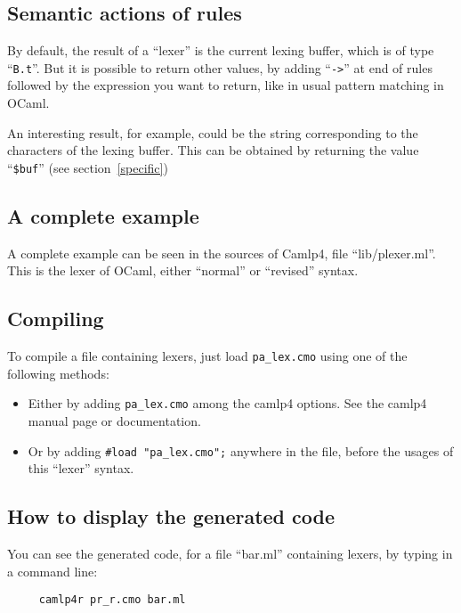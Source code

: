 \documentclass[11pt]{article}
\begin{document}
\subsection{Semantic actions of rules}

By default, the result of a ``lexer'' is the current lexing buffer,
which is of type ``\verb/B.t/''. But it is possible to return other
values, by adding ``\verb/->/'' at end of rules followed by the
expression you want to return, like in usual pattern matching in
OCaml.

An interesting result, for example, could be the string corresponding
to the characters of the lexing buffer. This can be obtained by
returning the value ``\verb/$buf/'' (see section~\ref{specific})

\subsection{A complete example}

A complete example can be seen in the sources of Camlp4, file
``lib/plexer.ml''. This is the lexer of OCaml, either ``normal'' or
``revised'' syntax.

\subsection{Compiling}

To compile a file containing lexers, just load \verb/pa_lex.cmo/ using
one of the following methods:

\begin{itemize}

\item Either by adding \verb/pa_lex.cmo/ among the camlp4 options. See
  the camlp4 manual page or documentation.
\item Or by adding \verb/#load "pa_lex.cmo";/ anywhere in the file,
  before the usages of this ``lexer'' syntax.

\end{itemize}

\subsection{How to display the generated code}

You can see the generated code, for a file ``bar.ml'' containing
lexers, by typing in a command line:

\begin{verbatim}
     camlp4r pr_r.cmo bar.ml
\end{verbatim}
\end{document}
